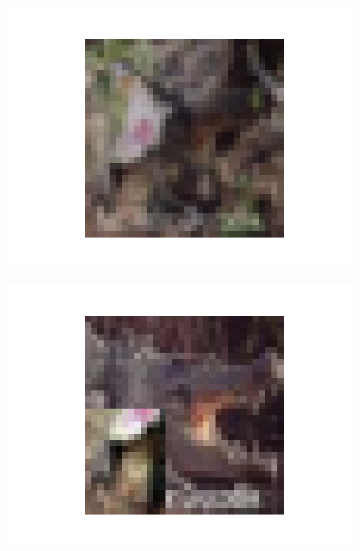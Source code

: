 \documentclass{article}
\begin{document}
\begin{figure}[h]
\begin{subfigure}{0.19\textwidth}
\end{subfigure}
\begin{subfigure}{0.19\textwidth}
\includegraphics[width=\linewidth]{figure/mixup0.png}
\end{subfigure}
\begin{subfigure}{0.19\textwidth}
\includegraphics[width=\linewidth]{figure/cutmix0.png}
\end{subfigure}
\begin{subfigure}{0.19\textwidth}

\end{subfigure}
\end{figure}
\end{document}
